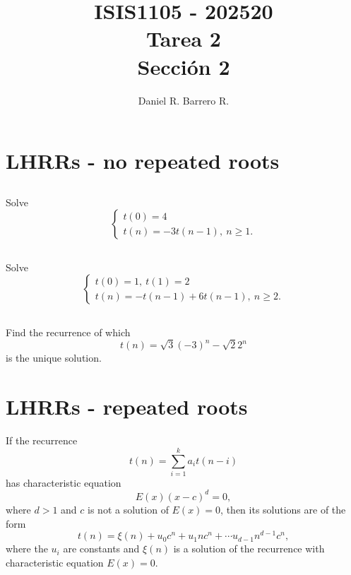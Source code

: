 \documentclass{amsart}
\title{ISIS1105 - 202520\\ Tarea 2\\ Sección 2}
\author{Daniel R. Barrero R.}
\begin{document}
\maketitle

\section{LHRRs - no repeated roots}

%

\subsection{} Solve
\begin{displaymath}
	\begin{cases}
		t(0)= 4\\
		t(n)= -3t(n-1),\ n \geq 1.
	\end{cases}
\end{displaymath}

%

\subsection{} Solve
\begin{displaymath}
	\begin{cases}
		t(0)= 1,\ t(1)= 2\\
		t(n)= -t(n-1) + 6t(n-1),\ n \geq 2.
	\end{cases}
\end{displaymath}

%

\subsection{} Find the recurrence of which
\[
	t(n)= \sqrt{3}(-3)^n - \sqrt{2}2^n
\]
is the unique solution.

\section{LHRRs - repeated roots}
\begin{thm}\label{hrep}
	If the recurrence
	\[
		t(n)= \sum_{i= 1}^k a_i t(n-i)
	\]
	has characteristic equation
	\[
		E(x)(x-c)^d= 0,
	\]
	where $d > 1$ and $c$ is not a solution of $E(x)= 0$, then its solutions
	are of the form
	\[
		t(n) = \xi(n) + u_0c^n + u_1nc^n + \cdots u_{d-1}n^{d-1}c^n,
	\]
	where the $u_i$ are constants and $\xi(n)$ is a solution of the
	recurrence with characteristic equation $E(x)= 0$.
\end{thm}
\end{document}
